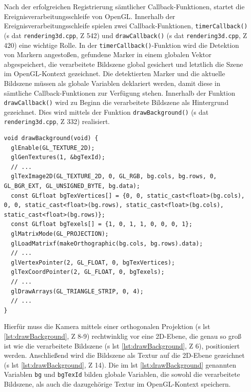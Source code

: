 \noindent Nach der erfolgreichen Registrierung sämtlicher Callback-Funktionen, startet die Ereignisverarbeitungsschleife von OpenGL. Innerhalb der Ereignisverarbeitungsschleife spielen zwei Callback-Funktionen, \texttt{timerCallback()} (\acs{s} \acs{dat} \texttt{rendering3d.cpp}, \acs{Z} 542) und \texttt{drawCallback()} (\acs{s} \acs{dat} \texttt{rendering3d.cpp}, \acs{Z} 420) eine wichtige Rolle. In der \texttt{timerCallback()}-Funktion wird die Detektion von Markern angestoßen, gefundene Marker in einem globalen Vektor abgespeichert, die verarbeitete Bildszene global gesichert und letztlich die Szene im OpenGL-Kontext gezeichnet. Die detektierten Marker und die aktuelle Bildszene müssen als globale Variablen deklariert werden, damit diese in sämtliche Callback-Funktionen zur Verfügung stehen. Innerhalb der Funktion \texttt{drawCallback()} wird zu Beginn die verarbeitete Bildszene als Hintergrund gezeichnet. Dies wird mittels der Funktion \texttt{drawBackground()} (\acs{s} \acs{dat} \texttt{rendering3d.cpp}, \acs{Z} 332) realisiert.

\newpage

\begin{lstlisting}[caption={Die Funktion \texttt{rendering3d.cpp/drawBackground()} zeichnet den Inhalt des aktuell verarbeiteten Bilds auf eine 2D-Ebene, die orthogonal zu Kamera steht}, label={lst:drawBackground}]
void drawBackground(void) {
  glEnable(GL_TEXTURE_2D);
  glGenTextures(1, &bgTexId);
  // ...
  glTexImage2D(GL_TEXTURE_2D, 0, GL_RGB, bg.cols, bg.rows, 0, GL_BGR_EXT, GL_UNSIGNED_BYTE, bg.data);
  const GLfloat bgTexVertices[] = {0, 0, static_cast<float>(bg.cols), 0, 0, static_cast<float>(bg.rows), static_cast<float>(bg.cols), static_cast<float>(bg.rows)};
  const GLfloat bgTexels[] = {1, 0, 1, 1, 0, 0, 0, 1};
  glMatrixMode(GL_PROJECTION);
  glLoadMatrixf(makeOrthographic(bg.cols, bg.rows).data);
  // ...
  glVertexPointer(2, GL_FLOAT, 0, bgTexVertices);
  glTexCoordPointer(2, GL_FLOAT, 0, bgTexels);
  // ...
  glDrawArrays(GL_TRIANGLE_STRIP, 0, 4);
  // ...
}
\end{lstlisting}

\noindent Hierfür muss die Kamera mittels einer orthogonalen Projektion (\acs{s} \acs{lst} \ref{lst:drawBackground}, \acs{Z} 8-9) rechtwinklig vor eine 2D-Ebene, die genau so groß ist wie die verarbeitete Bildszene (\acs{s} \acs{lst} \ref{lst:drawBackground}, \acs{Z} 6), positioniert werden. Anschließend wird die Bildszene als Textur auf die 2D-Ebene gezeichnet (\acs{s} \acs{lst} \ref{lst:drawBackground}, \acs{Z} 14). Die im \acs{lst} \ref{lst:drawBackground} genannten Variablen \texttt{bg} und \texttt{bgTexId} bilden globale Variablen, die sowohl die verarbeitete Bildszene, als auch die dazugehörige Textur im OpenGL-Kontext speichern.

